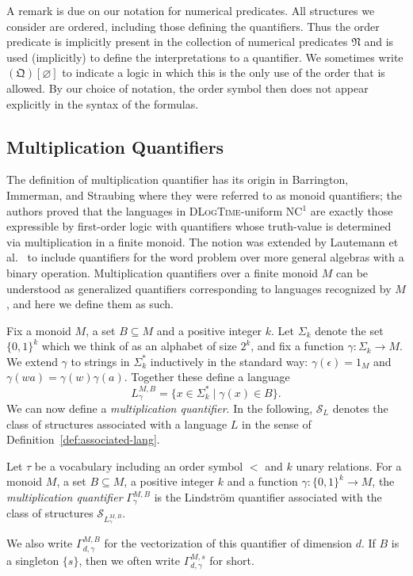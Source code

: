 \documentclass[a4paper,UKenglish,cleveref, autoref, thm-restate, anonymous]{lipics-v2021}
\begin{document}
A remark is due on our notation for numerical predicates.  All structures we consider are ordered, including those defining the quantifiers.  Thus the order predicate is implicitly present in the collection of numerical predicates $\mathfrak{N}$ and is used (implicitly) to define the interpretations to a quantifier.  We sometimes write $(\mathfrak{Q})[\varnothing]$ to indicate a logic in which this is the only use of the order that is allowed.  By our choice of notation, the order symbol then does not appear explicitly in the syntax of the formulas.

\subsection{Multiplication Quantifiers}

The definition of multiplication quantifier has its origin in Barrington, Immerman, and Straubing \cite[Section 5]{barrington1990uniformity} where they were referred to as monoid quantifiers; the authors proved that the languages in \textsc{DLogTime}-uniform NC${}^1$ are exactly those expressible by first-order logic with quantifiers whose truth-value is determined via multiplication in a finite monoid.  The notion was extended by Lautemann et al.~\cite{lautemann2001descriptive} to include quantifiers for the word problem over more general algebras with a binary operation.  Multiplication quantifiers over a finite monoid $M$ can be understood as generalized quantifiers corresponding to languages recognized by $M$, and here we define them as such.

Fix a monoid $M$, a set $B \subseteq M$ and a positive integer $k$.  Let $\Sigma_k$ denote the set $\{0,1\}^k$ which we think of as an alphabet of size $2^k$, and fix a function $\gamma: \Sigma_k \rightarrow M$.  We extend $\gamma$ to strings in $\Sigma_k^*$ inductively in the standard way: $\gamma(\epsilon) = 1_M$ and $\gamma(wa) = \gamma(w)\gamma(a)$.  Together these define a language
$$L^{M,B}_{\gamma} = \{ x \in \Sigma_k^* \mid \gamma(x) \in B\}.$$
We can now define a \emph{multiplication quantifier}.  In the following, $\mathcal{S}_L$ denotes the class of structures associated with a language $L$ in the sense of Definition~\ref{def:associated-lang}.
\begin{definition}\label{def:multquant}
Let $\tau$ be a vocabulary including an order symbol $<$ and $k$ unary relations.
For a monoid $M$, a set $B \subseteq M$, a positive integer $k$ and a function $\gamma: \{0,1\}^k \rightarrow M$, the \emph{multiplication quantifier} $\Gamma_{\gamma}^{M,B}$ is the Lindstr\"om quantifier associated with the class of structures $\mathcal{S}_{L^{M,B}_{\gamma}}$.

We also write $\Gamma_{d,\gamma}^{M,B}$ for the vectorization of this quantifier of dimension $d$. If $B$ is a singleton $\{s\}$, then we often write $\Gamma^{M,s}_{d,\gamma}$ for short.
\end{definition}
\end{document}
